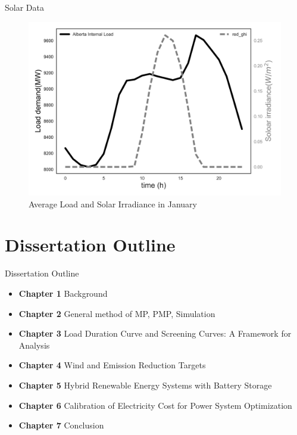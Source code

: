 \documentclass[newPxFont,numfooter,progressbar,sectionpages]{beamer}
\begin{document}

\begin{frame}[c]{Solar Data}

\begin{figure}
\centering
\includegraphics[width=0.9\linewidth]{"figure/load_rad"}
\caption{Average Load and Solar Irradiance in January}
\label{fig:load_rad}
\end{figure}



\end{frame}


%
%
\section{Dissertation Outline}



\begin{frame}[c]{Dissertation Outline}


\begin{itemize}
\item \textbf{Chapter 1} Background
\item \textbf{Chapter 2} General method of MP, PMP, Simulation
\item \textbf{Chapter 3} Load Duration Curve and Screening Curves: A Framework for Analysis
\item \textbf{Chapter 4} Wind and Emission Reduction Targets
\item \textbf{Chapter 5} Hybrid Renewable Energy Systems with Battery Storage
\item \textbf{Chapter 6} Calibration of Electricity Cost for Power System Optimization
\item \textbf{Chapter 7} Conclusion


\end{itemize}

\end{frame}
\end{document}
